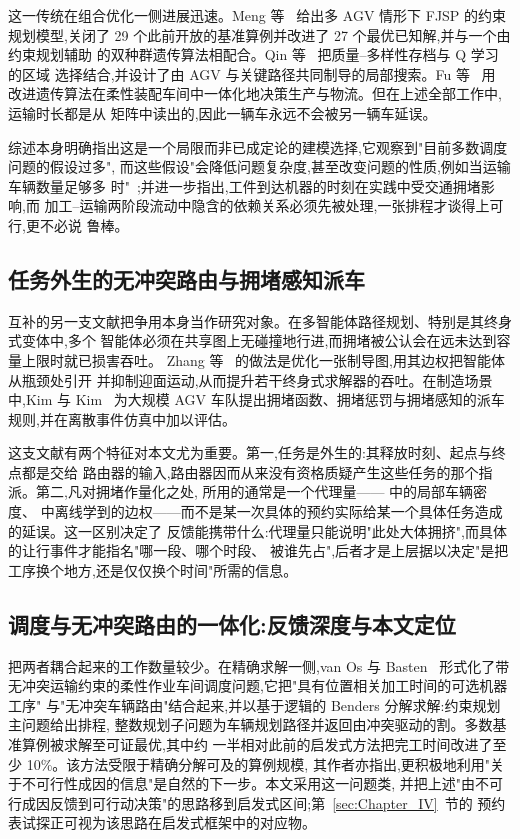 \documentclass[manuscript,screen,review]{acmart}
\begin{document}
这一传统在组合优化一侧进展迅速。Meng 等~\cite{meng2025cp} 给出多 AGV 情形下 FJSP 的约束
规划模型,关闭了 29 个此前开放的基准算例并改进了 27 个最优已知解,并与一个由约束规划辅助
的双种群遗传算法相配合。Qin 等~\cite{qin2026knowledge} 把质量--多样性存档与 Q 学习的区域
选择结合,并设计了由 AGV 与关键路径共同制导的局部搜索。Fu 等~\cite{fu2025integrated} 用
改进遗传算法在柔性装配车间中一体化地决策生产与物流。但在上述全部工作中,运输时长都是从
矩阵中读出的,因此一辆车永远不会被另一辆车延误。

综述本身明确指出这是一个局限而非已成定论的建模选择,它观察到"目前多数调度问题的假设过多",
而这些假设"会降低问题复杂度,甚至改变问题的性质,例如当运输车辆数量足够多
时"~\cite{xin2025review};并进一步指出,工件到达机器的时刻在实践中受交通拥堵影响,而
加工--运输两阶段流动中隐含的依赖关系必须先被处理,一张排程才谈得上可行,更不必说
鲁棒。

\subsection{任务外生的无冲突路由与拥堵感知派车}

互补的另一支文献把争用本身当作研究对象。在多智能体路径规划、特别是其终身式变体中,多个
智能体必须在共享图上无碰撞地行进,而拥堵被公认会在远未达到容量上限时就已损害吞吐。
Zhang 等~\cite{zhang2024guidance} 的做法是优化一张制导图,用其边权把智能体从瓶颈处引开
并抑制迎面运动,从而提升若干终身式求解器的吞吐。在制造场景中,Kim 与
Kim~\cite{kim2026congestion} 为大规模 AGV 车队提出拥堵函数、拥堵惩罚与拥堵感知的派车
规则,并在离散事件仿真中加以评估。

这支文献有两个特征对本文尤为重要。第一,任务是外生的:其释放时刻、起点与终点都是交给
路由器的输入,路由器因而从来没有资格质疑产生这些任务的那个指派。第二,凡对拥堵作量化之处,
所用的通常是一个代理量——\cite{kim2026congestion} 中的局部车辆密度、\cite{zhang2024guidance}
中离线学到的边权——而不是某一次具体的预约实际给某一个具体任务造成的延误。这一区别决定了
反馈能携带什么:代理量只能说明"此处大体拥挤",而具体的让行事件才能指名"哪一段、哪个时段、
被谁先占",后者才是上层据以决定"是把工序换个地方,还是仅仅换个时间"所需的信息。

\subsection{调度与无冲突路由的一体化:反馈深度与本文定位}

把两者耦合起来的工作数量较少。在精确求解一侧,van Os 与 Basten~\cite{vanos2026exact}
形式化了带无冲突运输约束的柔性作业车间调度问题,它把"具有位置相关加工时间的可选机器工序"
与"无冲突车辆路由"结合起来,并以基于逻辑的 Benders 分解求解:约束规划主问题给出排程,
整数规划子问题为车辆规划路径并返回由冲突驱动的割。多数基准算例被求解至可证最优,其中约
一半相对此前的启发式方法把完工时间改进了至少 10\%。该方法受限于精确分解可及的算例规模,
其作者亦指出,更积极地利用"关于不可行性成因的信息"是自然的下一步。本文采用这一问题类,
并把上述"由不可行成因反馈到可行动决策"的思路移到启发式区间;第~\ref{sec:Chapter_IV}~节的
预约表试探正可视为该思路在启发式框架中的对应物。
\end{document}
